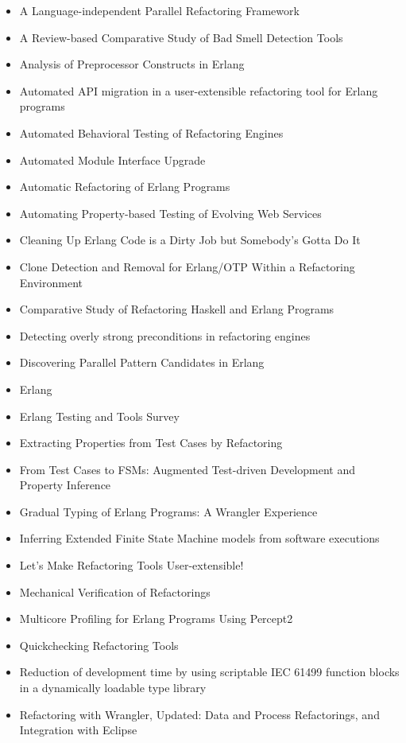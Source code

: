 \begin{itemize}
\item A Language-independent Parallel Refactoring Framework
\item A Review-based Comparative Study of Bad Smell Detection Tools
\item Analysis of Preprocessor Constructs in Erlang
\item Automated API migration in a user-extensible refactoring tool for Erlang programs
\item Automated Behavioral Testing of Refactoring Engines
\item Automated Module Interface Upgrade
\item Automatic Refactoring of Erlang Programs
\item Automating Property-based Testing of Evolving Web Services
\item Cleaning Up Erlang Code is a Dirty Job but Somebody's Gotta Do It
\item Clone Detection and Removal for Erlang/OTP Within a Refactoring Environment
\item Comparative Study of Refactoring Haskell and Erlang Programs
\item Detecting overly strong preconditions in refactoring engines
\item Discovering Parallel Pattern Candidates in Erlang
\item Erlang
\item Erlang Testing and Tools Survey
\item Extracting Properties from Test Cases by Refactoring
\item From Test Cases to FSMs: Augmented Test-driven Development and Property Inference
\item Gradual Typing of Erlang Programs: A Wrangler Experience
\item Inferring Extended Finite State Machine models from software executions
\item Let's Make Refactoring Tools User-extensible!
\item Mechanical Verification of Refactorings
\item Multicore Profiling for Erlang Programs Using Percept2
\item Quickchecking Refactoring Tools
\item Reduction of development time by using scriptable IEC 61499 function blocks in a dynamically loadable type library
\item Refactoring with Wrangler, Updated: Data and Process Refactorings, and Integration with Eclipse

\end{itemize}
